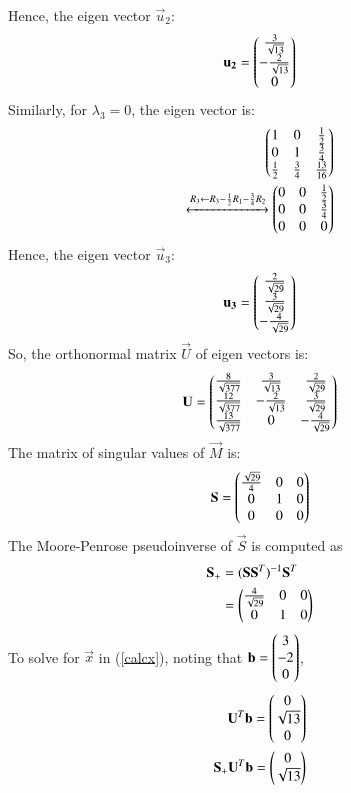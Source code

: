 \documentclass[journal,12pt,twocolumn]{IEEEtran}
\begin{document}
Hence, the eigen vector $\vec{u}_2$:
\begin{align}
	\mathbf{u_2}= \begin{pmatrix}\frac{3}{\sqrt{13}} \\ -\frac{2}{\sqrt{13}} \\ 0 \end{pmatrix}
\end{align}
Similarly, for $\lambda_3=0$, the eigen vector is:
\begin{align}
	\begin{pmatrix}1 & 0 & \frac{1}{2} \\ 0 & 1 & \frac{3}{4} \\
	\frac{1}{2} & \frac{3}{4} & \frac{13}{16} \end{pmatrix}  \\
	\xleftrightarrow[]{R_3 \leftarrow R_3-\frac{1}{2}R_1-\frac{3}{4}R_2}
	\begin{pmatrix}0 & 0 & \frac{1}{2} \\ 0 & 0 & \frac{3}{4} \\
	0	& 	0	&	0 \end{pmatrix} 
\end{align}
Hence, the eigen vector $\vec{u}_3$:
\begin{align}
	\mathbf{u_3}= \begin{pmatrix}\frac{2}{\sqrt{29}} \\ \frac{3}{\sqrt{29}} \\ 
	-\frac{4}{\sqrt{29}} \end{pmatrix}
\end{align}
So, the orthonormal matrix $\vec{U}$ of eigen vectors is:
\begin{align}
   \mathbf{U}= \begin{pmatrix}
	   \frac{8}{\sqrt{377}} & \frac{3}{\sqrt{13}} & \frac{2}{\sqrt{29}}  \\ 
	   \frac{12}{\sqrt{377}} & -\frac{2}{\sqrt{13}} & \frac{3}{\sqrt{29}}\\ 
	   \frac{13}{\sqrt{377}} & 0 & -\frac{4}{\sqrt{29}} \end{pmatrix}
\end{align}
The matrix of singular values of $\vec{M}$ is: 
\begin{align}
   \mathbf{S}= \begin{pmatrix} \frac{\sqrt{29}}{4} & 0 & 0 \\
	   0 & 1 & 0 \\ 0 & 0 & 0\end{pmatrix}
\end{align}
The Moore-Penrose pseudoinverse of $\vec{S}$ is computed as
\begin{align}
	\mathbf{S}_{+} &= (\mathbf{S}\mathbf{S}^T)^{-1}\mathbf{S}^T 	\\
		&= \begin{pmatrix} \frac{4}{\sqrt{29}} & 0 & 0 \\ 0 & 1 & 0 \end{pmatrix}
\end{align}
To solve for $\vec{x}$ in (\ref{calcx}), noting that $\mathbf{b}=\begin{pmatrix}3 \\ -2 \\ 0\end{pmatrix}$, 
\begin{align}
\mathbf{U}^T\mathbf{b} = \begin{pmatrix}
	0 \\ \sqrt{13} \\ 0 \end{pmatrix} \\
\mathbf{S}_{+}\mathbf{U}^T\mathbf{b} = \begin{pmatrix} 0 \\ \sqrt{13} \end{pmatrix}
\end{align}
\end{document}
